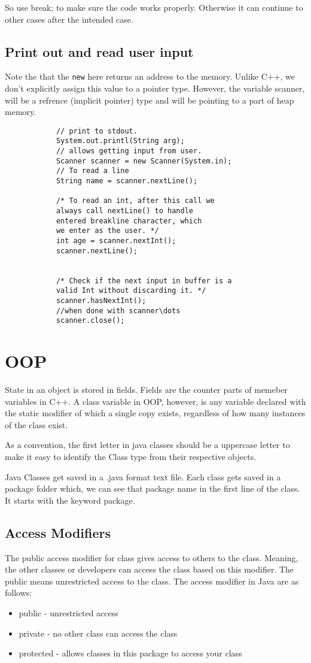 \documentclass[11pt,twoside,a4paper]{report}
\begin{document}
So use break; to make sure the code works properly. Otherwise it can continue to other cases after the intended case.

\section{Print out and read user input}
Note the that the \verb|new| here returns an address to the memory. Unlike C++, we don't explicitly assign this value to a pointer type.
However, the variable scanner, will be a refrence (implicit pointer) type and will be pointing to a part of heap memory.
\begin{lstlisting}
            // print to stdout.
            System.out.printl(String arg);
            // allows getting input from user.
            Scanner scanner = new Scanner(System.in);
            // To read a line
            String name = scanner.nextLine();

            /* To read an int, after this call we 
            always call nextLine() to handle 
            entered breakline character, which 
            we enter as the user. */
            int age = scanner.nextInt();
            scanner.nextLine();
            

            /* Check if the next input in buffer is a 
            valid Int without discarding it. */
            scanner.hasNextInt();
            //when done with scanner\dots
            scanner.close();
            \end{lstlisting}

\chapter{OOP}
State in an object is stored in fields. Fields are the counter parts of memeber variables in C++.
A class variable in OOP, however, is any variable declared with the static modifier of which a single copy exists, regardless of how many instances of the class exist.

As a convention, the first letter in java classes should be a uppercase letter to make it easy to identify the Class type from their respective objects.

Java Classes get saved in a .java format text file. Each class gets saved in a package folder which, we can see that package name in the first line of the class. It starts with the keyword package.

\section{Access Modifiers}
The public access modifier for class gives access to others to the class. Meaning, the other classes or developers can access the class based on this modifier.
The public means unrestricted access to the class.
The access modifier in Java are as follows:
\begin{itemize}
    \item public - unrestricted access
    \item private - no other class can access the class
    \item protected - allows classes in this package to access your class
\end{itemize}
\end{document}

